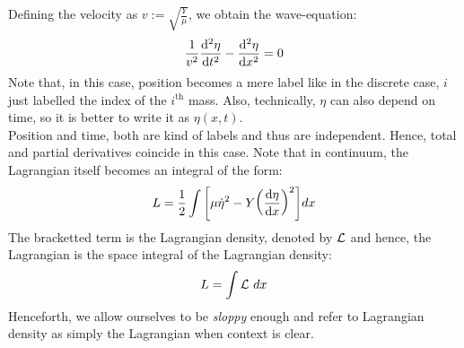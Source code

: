 Defining the velocity as $v:= \sqrt{\frac{Y}{\mu}}$, we obtain the wave-equation:
$$\frac{1}{v^2}\dv[2]{\eta}{t} -\dv[2]{\eta}{x} = 0 $$
Note that, in this case, position becomes a mere label like in the discrete case, $i$ just labelled the index of the $i^{\mathrm{th}}$ mass. Also, technically, $\eta$ can also depend on time, so it is better to write it as $\eta(x,t)$. \\[0.2cm]
Position and time, both are kind of labels and thus are independent. Hence, total and partial derivatives coincide in this case. Note that in continuum, the Lagrangian itself becomes an integral of the form:
$$L = \frac{1}{2}\int \qty[\mu \dot{\eta}^2 - Y \qty(\dv{\eta}{x})^2] dx$$
The bracketted term is the Lagrangian density, denoted by $\mathcal L$ and hence, the Lagrangian is the space integral of the Lagrangian density: $$L = \int \mathcal L \ dx$$
Henceforth, we allow ourselves to be \textit{sloppy} enough and refer to Lagrangian density as simply the Lagrangian when context is clear.
